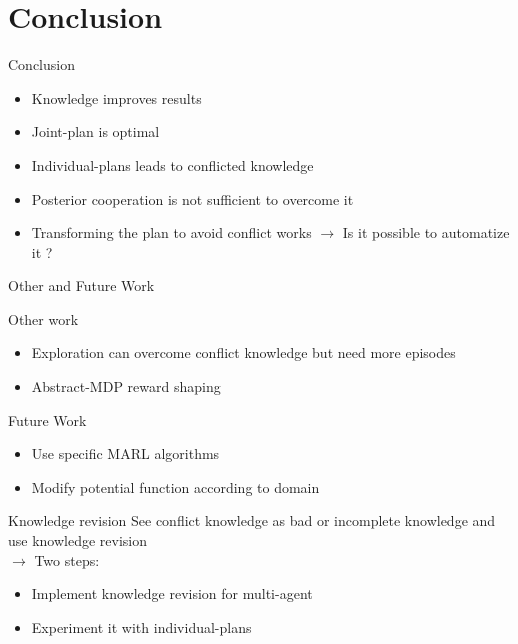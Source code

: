 \documentclass{bredelebeamer}
\begin{document}
\section{Conclusion}

\begin{frame}{Conclusion}

\begin{block}{}
\begin{itemize}
\item Knowledge improves results
\item Joint-plan is optimal
\item Individual-plans leads to conflicted knowledge
\item Posterior cooperation is not sufficient to overcome it
\item Transforming the plan to avoid conflict works
$\rightarrow$ Is it possible to automatize it ?
\end{itemize}
\end{block}

\end{frame}

\begin{frame}{Other and Future Work}

\begin{block}{Other work}
\begin{itemize}
\item Exploration can overcome conflict knowledge but need more episodes
\item Abstract-MDP reward shaping
\end{itemize}
\end{block}

\begin{block}{Future Work}
\begin{itemize}
\item Use specific MARL algorithms
\item Modify potential function according to domain
\end{itemize}

\hspace*{.1\linewidth}\begin{minipage}{.8\linewidth}
\begin{center}
\begin{exampleblock}{Knowledge revision}
See conflict knowledge as bad or incomplete knowledge and use knowledge revision\\
$\rightarrow$ Two steps:
\begin{itemize}
\item Implement knowledge revision for multi-agent
\item Experiment it with individual-plans
\end{itemize}
\end{exampleblock}

\end{center}
\end{minipage}
\medskip
\end{block}

\end{frame}
\end{document}

